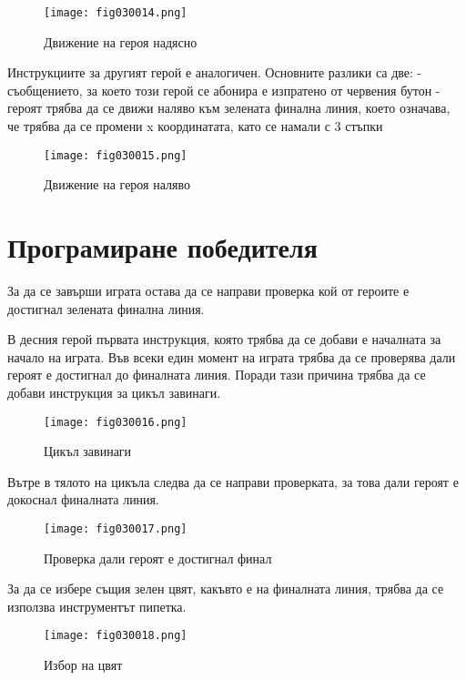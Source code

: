 \begin{figure}[H]
  \centering
  \texttt{[image: fig030014.png]}
  \caption{Движение на героя надясно}
\label{fig030014}
\end{figure}

Инструкциите за другият герой е аналогичен. Основните разлики са две:
- съобщението, за което този герой се абонира е изпратено от червения бутон
- героят трябва да се движи наляво към зелената финална линия, което означава, че трябва да се промени x координатата, като се намали с 3 стъпки

\begin{figure}[H]
  \centering
  \texttt{[image: fig030015.png]}
  \caption{Движение на героя наляво}
\label{fig030015}
\end{figure}

\section{Програмиране победителя}
За да се завърши играта остава да се направи проверка кой от героите е достигнал зелената финална линия.

В десния герой първата инструкция, която трябва да се добави е началната за начало на играта. Във всеки един момент на играта трябва да се проверява дали героят е достигнал до финалната линия. Поради тази причина трябва да се добави инструкция за цикъл завинаги.

\begin{figure}[H]
  \centering
  \texttt{[image: fig030016.png]}
  \caption{Цикъл завинаги}
\label{fig030016}
\end{figure}

Вътре в тялото на цикъла следва да се направи проверката, за това дали героят е докоснал финалната линия.

\begin{figure}[H]
  \centering
  \texttt{[image: fig030017.png]}
  \caption{Проверка дали героят е достигнал финал}
\label{fig030017}
\end{figure}

За да се избере същия зелен цвят, какъвто е на финалната линия, трябва да се използва инструментът пипетка.

\begin{figure}[H]
  \centering
  \texttt{[image: fig030018.png]}
  \caption{Избор на цвят}
\label{fig030018}
\end{figure}

